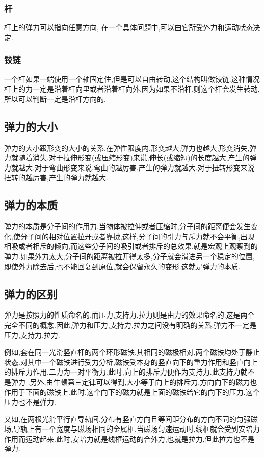 \subsubsection{杆}
杆上的弹力可以指向任意方向, 在一个具体问题中,可以由它所受外力和运动状态决定.
\subsubsection{铰链}
一个杆如果一端使用一个轴固定住,但是可以自由转动,这个结构叫做铰链.这种情况杆上的力一定是沿着杆向里或者沿着杆向外.因为如果不沿杆,则这个杆会发生转动,所以可以判断一定是沿杆方向的.

\subsection{弹力的大小}
弹力的大小跟形变的大小的关系.在弹性限度内,形变越大,弹力也越大;形变消失,弹力就随着消失.对于拉伸形变(或压缩形变)来说,伸长(或缩短)的长度越大,产生的弹力就越大.对于弯曲形变来说,弯曲的越厉害,产生的弹力就越大.对于扭转形变来说扭转的越厉害,产生的弹力就越大.

\subsection{弹力的本质}
 弹力的本质是分子间的作用力.当物体被拉伸或者压缩时,分子间的距离便会发生变化,使分子间的相对位置拉开或者靠拢,这样,分子间的引力与斥力就不会平衡,出现相吸或者相斥的倾向,而这些分子间的吸引或者排斥的总效果,就是宏观上观察到的弹力.如果外力太大,分子间的距离被拉开得太多,分子就会滑进另一个稳定的位置,即使外力除去后,也不能回复到原位,就会保留永久的变形.这就是弹力的本质.

 \subsection{弹力的区别}
 弹力是按照力的性质命名的.而压力,支持力,拉力则是由力的效果命名的.这是两个完全不同的概念.因此,弹力和压力,支持力,拉力之间没有明确的关系.弹力不一定是压力,支持力,拉力.

 例如,套在同一光滑竖直杆的两个环形磁铁,其相同的磁极相对,两个磁铁均处于静止状态.对其中一个磁铁进行受力分析,磁铁受本身的竖直向下的重力作用和竖直向上的排斥力作用,二力为一对平衡力.此时,向上的排斥力便作为支持力.此支持力就不是弹力 .另外,由牛顿第三定律可以得到,大小等于向上的排斥力,方向向下的磁力也作用于下面的磁铁上.此时,这个向下的磁力就是上面的磁铁给它的向下的压力.这个压力也不是弹力.

 又如,在两根光滑平行直导轨间,分布有竖直方向且等间距分布的方向不同的匀强磁场,导轨上有一个宽度与磁场相同的金属框.当磁场匀速运动时,线框就会受到安培力作用而运动起来.此时,安培力就是线框运动的合外力,也就是拉力,但此拉力也不是弹力.

